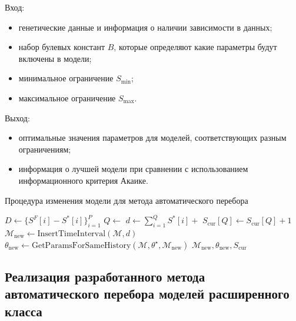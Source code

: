 Вход:
\begin{itemize}
    \item генетические данные и информация о наличии зависимости в данных;
    \item набор булевых констант $B$, которые определяют какие параметры будут включены в модели;
    \item минимальное ограничение $S_{\min}$;
    \item максимальное ограничение $S_{\max}$.
\end{itemize}

Выход:
\begin{itemize}
    \item оптимальные значения параметров для моделей, соответствующих разным ограничениям;
    \item информация о лучшей модели при сравнении с использованием информационного критерия Акаике.
\end{itemize}

\begin{algorithm}
\caption{Процедура изменения модели для метода автоматического перебора}\label{alg:increase}
\begin{algorithmic}[1]
\State $D \leftarrow \{S^F[i] - S^*[i] \}_{i=1}^P$ 
\State $Q \leftarrow $ 
\State $d \leftarrow \sum_{i=1}^Q S^*[i] + $  
\State $S_\text{cur}[Q] \leftarrow S_\text{cur}[Q] + 1$ 
\State $\mathcal{M}_{\text{new}} \leftarrow \text{InsertTimeInterval}(\mathcal{M}, d)$ 
\State {}
\State $\theta_{\text{new}} \leftarrow \text{GetParamsForSameHistory}(\mathcal{M}, \theta^\star, \mathcal{M}_\text{new})$
\State \Return $\mathcal{M}_\text{new}, \theta_\text{new}, S_\text{cur}$
\EndFunction
\end{algorithmic}
\end{algorithm}


\FloatBarrier
\subsection{Реализация разработанного метода автоматического перебора моделей расширенного класса}
\label{sec:part4:implementation}

